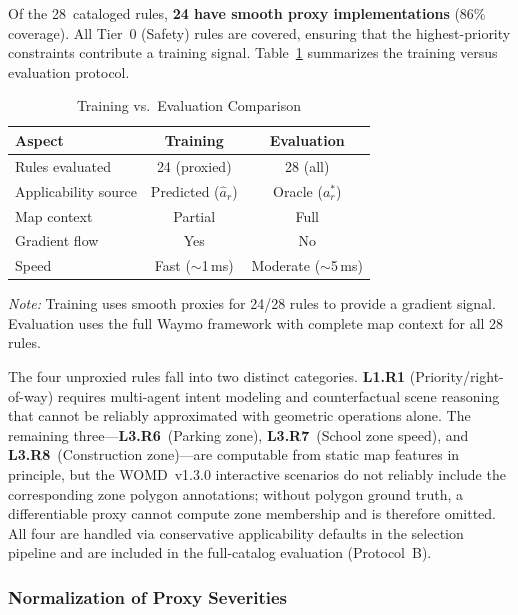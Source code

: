 Of the 28~cataloged rules, \textbf{24 have smooth proxy implementations}
(86\% coverage).  All Tier~0 (Safety) rules are covered, ensuring that the highest-priority constraints contribute a training signal. Table~\ref{tab:training_eval_comparison} summarizes the training versus evaluation protocol.

\begin{table}[h]
\centering
\caption{Training vs.\ Evaluation Comparison}
\label{tab:training_eval_comparison}
\begin{tabular}{lcc}
\toprule
\textbf{Aspect} & \textbf{Training} & \textbf{Evaluation} \\
\midrule
Rules evaluated & 24 (proxied) & 28 (all) \\
Applicability source & Predicted ($\hat{a}_r$) & Oracle ($a_r^*$) \\
Map context & Partial & Full \\
Gradient flow & Yes & No \\
Speed & Fast ($\sim$1\,ms) & Moderate ($\sim$5\,ms) \\
\bottomrule
\end{tabular}
\vspace{2mm}
\footnotesize
\textit{Note:} Training uses smooth proxies for 24/28 rules to provide a
gradient signal.  Evaluation uses the full Waymo framework with complete map
context for all 28 rules.
\end{table}

The four unproxied rules fall into two distinct categories. \textbf{L1.R1} (Priority/right-of-way) requires multi-agent intent modeling and counterfactual scene reasoning that cannot be reliably approximated with geometric operations alone.  The remaining three---\textbf{L3.R6}~(Parking zone), \textbf{L3.R7}~(School zone speed), and \textbf{L3.R8}~(Construction zone)---are computable from static map features in principle, but the WOMD~v1.3.0 interactive scenarios do not reliably include the corresponding zone polygon annotations; without polygon ground truth, a differentiable proxy cannot compute zone membership and is therefore omitted.  All four are handled via conservative applicability defaults in the selection pipeline and are included in the full-catalog evaluation (Protocol~B).

\subsubsection{Normalization of Proxy Severities}

